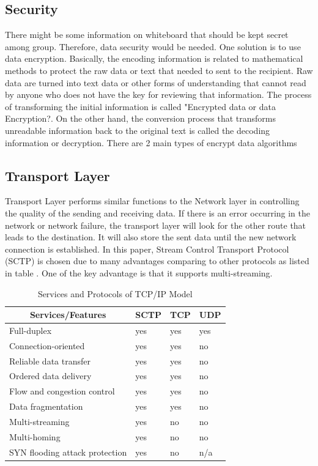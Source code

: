 \documentclass[conference]{IEEEtran}
\begin{document}
\subsection{Security}
There might be some information on whiteboard that should be kept secret among group. Therefore, data security would be needed. One solution is to use data encryption. Basically, the encoding information is related to mathematical methods to protect the raw data or text that needed to sent to the recipient. Raw data are turned into text data or other forms of understanding that cannot read by anyone who does not have the key for reviewing that information. The process of transforming the initial information is called "Encrypted data or data Encryption?. On the other hand, the conversion process that transforms unreadable information back to the original text is called the decoding information or decryption. There are 2 main types of encrypt data algorithms
\subsection{Transport Layer}
Transport Layer performs similar functions to the Network layer in controlling the quality of the sending and receiving data. If there is an error occurring in the network or network failure, the transport layer will look for the other route that leads to the destination. It will also store the sent data until the new network connection is established. In this paper, Stream Control Transport Protocol (SCTP) is chosen due to many advantages comparing to other protocols as listed in table . One of the key advantage is that it supports multi-streaming. 

\begin{table}[h]
  \renewcommand{\arraystretch}{2}
  \renewcommand{\tabcolsep}{2mm}
  \centering
  \begin{tabularx}{0.5\textwidth}{|p{4.4cm}|p{1cm}|p{1cm}|p{1cm}|}
    \hline
    \multicolumn{1}{|c|}{\textbf{Services/Features}} &  
    \multicolumn{1}{c|}{\textbf{SCTP}} &
    \multicolumn{1}{c|}{\textbf{TCP}} &
    \multicolumn{1}{c|}{\textbf{UDP}} \\ \hline
    Full-duplex &  yes & yes & yes \\ \hline 
    Connection-oriented & yes & yes & no \\ \hline 
    Reliable data transfer & yes & yes & no \\ \hline 
    Ordered data delivery & yes & yes & no \\ \hline 
    Flow and congestion control & yes & yes & no \\ \hline
    Data fragmentation & yes & yes & no \\ \hline
    Multi-streaming & yes & no & no \\ \hline
    Multi-homing & yes & no & no \\ \hline
    SYN flooding attack protection & yes & no & n/a  \\ \hline
  \end{tabularx}
  \space
  \caption{Services and Protocols of TCP/IP Model}
  \label{tab:1}
\end{table}
\end{document}
